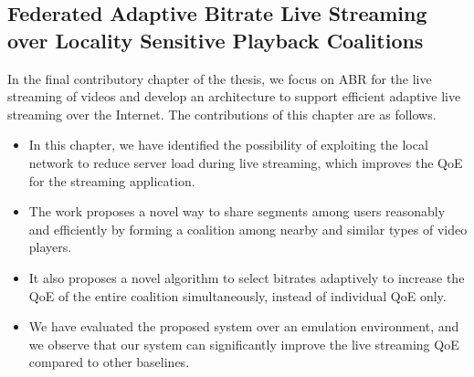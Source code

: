 \subsection{Federated Adaptive Bitrate Live Streaming over Locality Sensitive Playback Coalitions}
In the final contributory chapter of the thesis, we focus on \ac{ABR} for the live streaming of videos and develop an architecture to support efficient adaptive live streaming over the Internet. The contributions of this chapter are as follows. 
\begin{itemize}
	\item In this chapter, we have identified the possibility of exploiting the local network to reduce server load during live streaming, which improves the \ac{QoE} for the streaming application.
	\item The work proposes a novel way to share segments among users reasonably and efficiently by forming a coalition among nearby and similar types of video players.
	\item It also proposes a novel algorithm to select bitrates adaptively to increase the \ac{QoE} of the entire coalition simultaneously, instead of individual \ac{QoE} only.
	\item We have evaluated the proposed system over an emulation environment, and we observe that our system can significantly improve the live streaming \ac{QoE} compared to other baselines. 
\end{itemize}